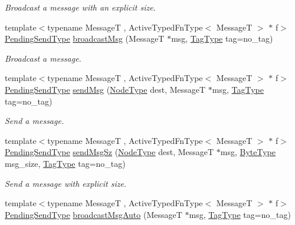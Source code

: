 \begin{DoxyCompactItemize}
\begin{DoxyCompactList}\small\item\em Broadcast a message with an explicit size. \end{DoxyCompactList}\item 
{\footnotesize template$<$typename MessageT , Active\+Typed\+Fn\+Type$<$ Message\+T $>$ $\ast$ f$>$ }\\\hyperlink{structvt_1_1messaging_1_1_active_messenger_a3626a6ca76d8ad4ec7c3b47a2c70d3a8}{Pending\+Send\+Type} \hyperlink{group__typesafehan_ga4a7106231ba8a26a1214a6f133e381eb}{broadcast\+Msg} (MessageT $\ast$msg, \hyperlink{namespacevt_a84ab281dae04a52a4b243d6bf62d0e52}{Tag\+Type} tag=no\+\_\+tag)
\begin{DoxyCompactList}\small\item\em Broadcast a message. \end{DoxyCompactList}\item 
{\footnotesize template$<$typename MessageT , Active\+Typed\+Fn\+Type$<$ Message\+T $>$ $\ast$ f$>$ }\\\hyperlink{structvt_1_1messaging_1_1_active_messenger_a3626a6ca76d8ad4ec7c3b47a2c70d3a8}{Pending\+Send\+Type} \hyperlink{group__typesafehan_gac6f823984e34114fc7b85f69395d2cd2}{send\+Msg} (\hyperlink{namespacevt_a866da9d0efc19c0a1ce79e9e492f47e2}{Node\+Type} dest, MessageT $\ast$msg, \hyperlink{namespacevt_a84ab281dae04a52a4b243d6bf62d0e52}{Tag\+Type} tag=no\+\_\+tag)
\begin{DoxyCompactList}\small\item\em Send a message. \end{DoxyCompactList}\item 
{\footnotesize template$<$typename MessageT , Active\+Typed\+Fn\+Type$<$ Message\+T $>$ $\ast$ f$>$ }\\\hyperlink{structvt_1_1messaging_1_1_active_messenger_a3626a6ca76d8ad4ec7c3b47a2c70d3a8}{Pending\+Send\+Type} \hyperlink{group__typesafehan_ga60d1e728bd80623cb4c5093aa4114654}{send\+Msg\+Sz} (\hyperlink{namespacevt_a866da9d0efc19c0a1ce79e9e492f47e2}{Node\+Type} dest, MessageT $\ast$msg, \hyperlink{namespacevt_aab8d55968084610ce3b17057981e9300}{Byte\+Type} msg\+\_\+size, \hyperlink{namespacevt_a84ab281dae04a52a4b243d6bf62d0e52}{Tag\+Type} tag=no\+\_\+tag)
\begin{DoxyCompactList}\small\item\em Send a message with explicit size. \end{DoxyCompactList}\item 
{\footnotesize template$<$typename MessageT , Active\+Typed\+Fn\+Type$<$ Message\+T $>$ $\ast$ f$>$ }\\\hyperlink{structvt_1_1messaging_1_1_active_messenger_a3626a6ca76d8ad4ec7c3b47a2c70d3a8}{Pending\+Send\+Type} \hyperlink{group__typesafehan_ga8d7ac047c1a1c84766d976a189e937e3}{broadcast\+Msg\+Auto} (MessageT $\ast$msg, \hyperlink{namespacevt_a84ab281dae04a52a4b243d6bf62d0e52}{Tag\+Type} tag=no\+\_\+tag)

\end{DoxyCompactItemize}
